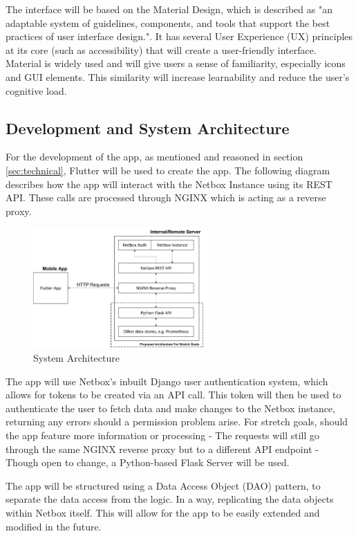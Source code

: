 \documentclass [11pt,a4paper]{article}
\begin{document}
The interface will be based on the Material Design, which is described as "an adaptable system of guidelines, components, and tools that support the best practices of user interface design."\cite{materialDesign}. It has several User Experience (UX) principles at its core (such as accessibility) that will create a user-friendly interface. Material is widely used and will give users a sense of familiarity, especially icons and GUI elements. This similarity will increase learnability and reduce the user's cognitive load.

\subsection{Development and System Architecture}
\label{sec:development} 
For the development of the app, as mentioned and reasoned in section \ref{sec:technical}, Flutter will be used to create the app. The following diagram describes how the app will interact with the Netbox Instance using its REST API. These calls are processed through NGINX which is acting as a reverse proxy.

\begin{figure}[H]
    \centering
    \includegraphics[width=0.6\textwidth]{images/top-level-archi.png}
    \caption{System Architecture}
    \label{fig:architecture}
\end{figure}

The app will use Netbox's inbuilt Django user authentication system, which allows for tokens to be created via an API call. This token will then be used to authenticate the user to fetch data and make changes to the Netbox instance, returning any errors should a permission problem arise. For stretch goals, should the app feature more information or processing - The requests will still go through the same NGINX reverse proxy but to a different API endpoint - Though open to change, a Python-based Flask Server will be used. 

The app will be structured using a Data Access Object (DAO) pattern\cite{dao}, to separate the data access from the logic. In a way, replicating the data objects within Netbox itself. This will allow for the app to be easily extended and modified in the future. 
\end{document}
